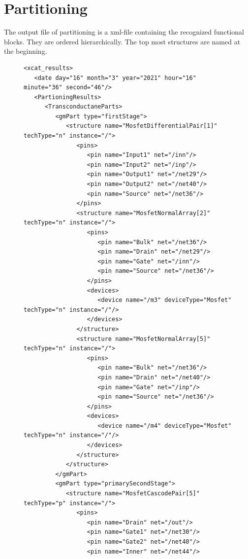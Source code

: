 \section{Partitioning}\label{sec:OutputFilePartitioning}
The output file of partitioning is a xml-file containing the recognized functional blocks. They are ordered hierarchically. The top most structures are named at the beginning.

\begin{figure}[H]
	\begin{lstlisting}[basicstyle=\ttfamily\scriptsize,backgroundcolor={\color{gray!30}}, escapechar=? ]
<xcat_results>
   <date day="16" month="3" year="2021" hour="16" minute="36" second="46"/>
   <PartioningResults>
      <TransconductaneParts>
         <gmPart type="firstStage">
            <structure name="MosfetDifferentialPair[1]" techType="n" instance="/">
               <pins>
                  <pin name="Input1" net="/inn"/>
                  <pin name="Input2" net="/inp"/>
                  <pin name="Output1" net="/net29"/>
                  <pin name="Output2" net="/net40"/>
                  <pin name="Source" net="/net36"/>
               </pins>
               <structure name="MosfetNormalArray[2]" techType="n" instance="/">
                  <pins>
                     <pin name="Bulk" net="/net36"/>
                     <pin name="Drain" net="/net29"/>
                     <pin name="Gate" net="/inn"/>
                     <pin name="Source" net="/net36"/>
                  </pins>
                  <devices>
                     <device name="/m3" deviceType="Mosfet" techType="n" instance="/"/>
                  </devices>
               </structure>
               <structure name="MosfetNormalArray[5]" techType="n" instance="/">
                  <pins>
                     <pin name="Bulk" net="/net36"/>
                     <pin name="Drain" net="/net40"/>
                     <pin name="Gate" net="/inp"/>
                     <pin name="Source" net="/net36"/>
                  </pins>
                  <devices>
                     <device name="/m4" deviceType="Mosfet" techType="n" instance="/"/>
                  </devices>
               </structure>
            </structure>
         </gmPart>
         <gmPart type="primarySecondStage">
            <structure name="MosfetCascodePair[5]" techType="p" instance="/">
               <pins>
                  <pin name="Drain" net="/out"/>
                  <pin name="Gate1" net="/net30"/>
                  <pin name="Gate2" net="/net40"/>
                  <pin name="Inner" net="/net44"/>

\end{lstlisting}
\end{figure}

